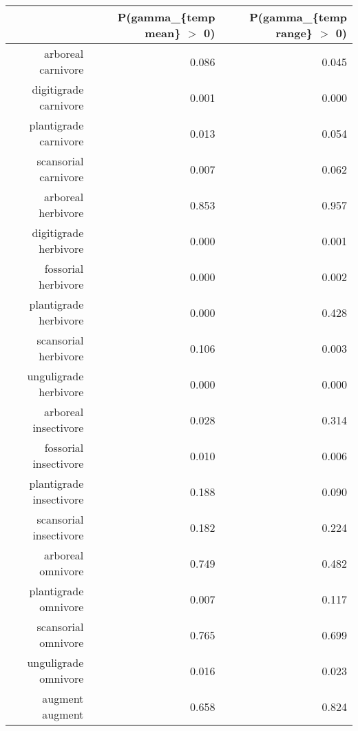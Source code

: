 \begin{table}[ht]
\centering
\begin{tabular}{rrr}
  \hline
 & P(gamma\_\{temp mean\} $>$ 0) & P(gamma\_\{temp range\} $>$ 0) \\ 
  \hline
arboreal carnivore & 0.086 & 0.045 \\ 
  digitigrade carnivore & 0.001 & 0.000 \\ 
  plantigrade carnivore & 0.013 & 0.054 \\ 
  scansorial carnivore & 0.007 & 0.062 \\ 
  arboreal herbivore & 0.853 & 0.957 \\ 
  digitigrade herbivore & 0.000 & 0.001 \\ 
  fossorial herbivore & 0.000 & 0.002 \\ 
  plantigrade herbivore & 0.000 & 0.428 \\ 
  scansorial herbivore & 0.106 & 0.003 \\ 
  unguligrade herbivore & 0.000 & 0.000 \\ 
  arboreal insectivore & 0.028 & 0.314 \\ 
  fossorial insectivore & 0.010 & 0.006 \\ 
  plantigrade insectivore & 0.188 & 0.090 \\ 
  scansorial insectivore & 0.182 & 0.224 \\ 
  arboreal omnivore & 0.749 & 0.482 \\ 
  plantigrade omnivore & 0.007 & 0.117 \\ 
  scansorial omnivore & 0.765 & 0.699 \\ 
  unguligrade omnivore & 0.016 & 0.023 \\ 
  augment augment & 0.658 & 0.824 \\ 
   \hline
\end{tabular}
\label{tab:origin_temp}
\end{table}
